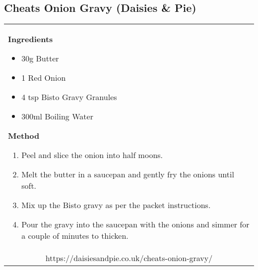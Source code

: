 \documentclass[web-recipes.tex]{subfiles}
\begin{document}
\renewcommand{\mytitle}{Cheats Onion Gravy (Daisies \& Pie)}
\renewcommand{\myurl}{https://daisiesandpie.co.uk/cheats-onion-gravy/}
    \begin{mdframed}[nobreak]
      \section{\mytitle}
      \begin{tabular}{l}
        \begin{minipage}[t]{0.35\textwidth}
          {\sffamily\bfseries Ingredients}\vspace{0.5ex}
              \begin{itemize}
                \item 30g Butter
                \item 1 Red Onion
                \item 4 tsp Bisto Gravy Granules
                \item 300ml Boiling Water
              \end{itemize}
        \end{minipage}
        \qquad
        \begin{minipage}[t]{0.55\textwidth}
          {\sffamily\bfseries Method}\vspace{0.5ex}
          \begin{enumerate}
            \item Peel and slice the onion into half moons.
            \item Melt the butter in a saucepan and gently fry the onions until
              soft.
            \item Mix up the Bisto gravy as per the packet instructions.
            \item Pour the gravy into the saucepan with the onions and simmer
              for a couple of minutes to thicken.
          \end{enumerate}
        \end{minipage} \vspace{3ex}\\
        \multicolumn{1}{c}{\small\ttfamily \myurl} \\
      \end{tabular}
    \end{mdframed}
    
\end{document}
